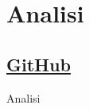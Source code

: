 \section{Analisi}
\subsection{\href{https://github.com/edoardosarri24/real-time-scheduling-simulator.git}{GitHub}}

\begin{frame}{Analisi}

\end{frame}